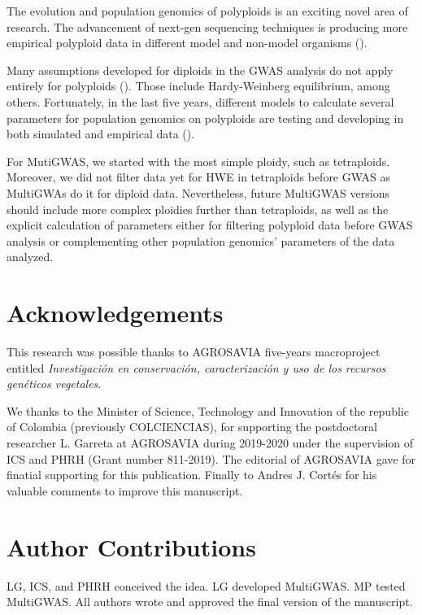 \documentclass{article}
\begin{document}
The evolution and population genomics of polyploids is an exciting novel area of research. The advancement of next-gen sequencing techniques is producing more empirical polyploid data in different model and non-model organisms  (\cite{ekblom2011applications,ellegren2014genome}). 

Many assumptions developed for diploids in the GWAS analysis do not apply entirely for polyploids (\cite{dufresne2014}). Those include Hardy-Weinberg equilibrium, among others. Fortunately, in the last five years, different models to calculate several parameters for population genomics on polyploids are testing and developing in both simulated and empirical data (\cite{meirmans2018,hardy2016population,blischak2016accounting}). 

For MutiGWAS, we started with the most simple ploidy, such as tetraploids. Moreover, we did not filter data yet for HWE in tetraploids before GWAS as MultiGWAs do it for diploid data. Nevertheless, future MultiGWAS versions should include more complex ploidies further than tetraploids, as well as the explicit calculation of parameters either for filtering polyploid data before GWAS analysis or complementing other population genomics' parameters of the data analyzed.

\section{Acknowledgements}
This research was possible thanks to AGROSAVIA five-years macroproject entitled \emph{Investigación en conservación, caracterización y uso de los recursos genéticos vegetales}.
 
We thanks to the Minister of Science, Technology and Innovation of the republic of Colombia (previously COLCIENCIAS), for supporting the postdoctoral researcher L. Garreta at AGROSAVIA during 2019-2020 under the supervision of ICS and PHRH (Grant number 811-2019). The editorial of AGROSAVIA gave for finatial supporting for this publication. Finally to Andres J. Cortés for his valuable comments to improve this manuscript.


\section{Author Contributions}
LG, ICS, and PHRH conceived the idea. LG developed MultiGWAS. MP tested MultiGWAS. All authors wrote and approved the final version of the manuscript.

\printbibliography
\end{document}
